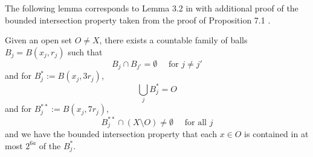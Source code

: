 The following lemma corresponds to Lemma 3.2 in \cite{stein-book} with additional proof of the bounded intersection property taken from the proof of Proposition 7.1 .
\begin{lemma}
    \label{ball-covering}
    \leanok
    Given an open set $O\ne X$, there exists a countable family of balls $B_j = B(x_j, r_j)$ such that
    \begin{equation}
        \label{balls-disjoint}
        B_j \cap B_{j'} = \emptyset \quad \text{ for } j \ne j'
    \end{equation}
    and for $B_j^* := B(x_j, 3r_j)$,
    \begin{equation}
        \label{balls-covering}
        \bigcup_j B_j^* = O
    \end{equation}
    and for $B_j^{**} := B(x_j, 7r_j)$,
    \begin{equation}
        \label{enlarged-balls-intersect-complement}
        B_j^{**} \cap (X \setminus O) \ne \emptyset \quad \text{ for all } j
    \end{equation}
    and we have the bounded intersection property that each $x\in O$ is contained in at most $2^{6a}$ of the $B_j^*$.
\end{lemma}
